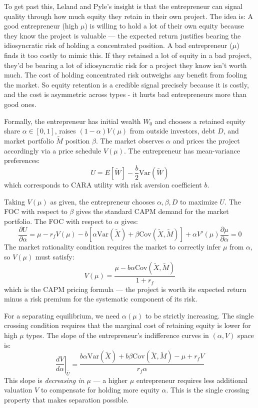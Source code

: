 \documentclass[11pt,english]{article}
\begin{document}
To get past this, Leland and Pyle's insight is that the entrepreneur can signal quality through how much equity they retain in their own project. The idea is: A good entrepreneur (high $\mu$) is willing to hold a lot of their own equity because they know the project is valuable — the expected return justifies bearing the idiosyncratic risk of holding a concentrated position. A bad entrepreneur ($\mu$) finds it too costly to mimic this. If they retained a lot of equity in a bad project, they'd be bearing a lot of idiosyncratic risk for a project they know isn't worth much. The cost of holding concentrated risk outweighs any benefit from fooling the market. So equity retention is a credible signal precisely because it is costly, and the cost is asymmetric across types - it hurts bad entrepreneurs more than good ones.

Formally, the entrepreneur has initial wealth $W_0$ and chooses a retained equity share $\alpha\in [0,1]$, raises $(1 - \alpha)V(\mu)$ from outside investors, debt $D$, and market portfolio $\tilde{M}$ position $\beta$. The market observes $\alpha$ and prices the project accordingly via a price schedule $V(\mu)$. The entrepreneur has mean-variance preferences:
\begin{equation}
    U = E[\tilde{W}] - \frac{b}{2}\text{Var}(\tilde{W})
\end{equation}
which corresponds to CARA utility with risk aversion coefficient $b$.

Taking $V(\mu)$ as given, the entrepreneur chooses $\alpha, \beta, D$ to maximize $U$. The FOC with respect to $\beta$ gives the standard CAPM demand for the market portfolio. The FOC with respect to $\alpha$ gives:
\begin{equation}
    \frac{\partial U}{\partial \alpha} = \mu - r_f V(\mu) - b\left[\alpha \text{Var}(\tilde{X}) + \beta \text{Cov}(\tilde{X}, \tilde{M})\right] + \alpha V'(\mu) \frac{\partial \mu}{\partial \alpha} = 0
\end{equation}
The market rationality condition requires the market to correctly infer $\mu$ from $\alpha$, so $V(\mu)$ must satisfy:
\begin{equation}
    V(\mu) = \frac{\mu - b\alpha\text{Cov}(\tilde{X}, \tilde{M})}{1 + r_f}
\end{equation}
which is the CAPM pricing formula --- the project is worth its expected return minus a risk premium for the systematic component of its risk.

For a separating equilibrium, we need $\alpha(\mu)$ to be strictly increasing. The single crossing condition requires that the marginal cost of retaining equity is lower for high $\mu$ types. The slope of the entrepreneur's indifference curves in $(\alpha, V)$ space is:
\begin{equation}
    \left.\frac{dV}{d\alpha}\right|_{\bar{U}} = \frac{b\alpha \text{Var}(\tilde{X}) + b\beta\text{Cov}(\tilde{X},\tilde{M}) - \mu + r_f V}{r_f \alpha}
\end{equation}
This slope is \textit{decreasing in $\mu$} --- a higher $\mu$ entrepreneur requires less additional valuation $V$ to compensate for holding more equity $\alpha$. This is the single crossing property that makes separation possible.
\end{document}
